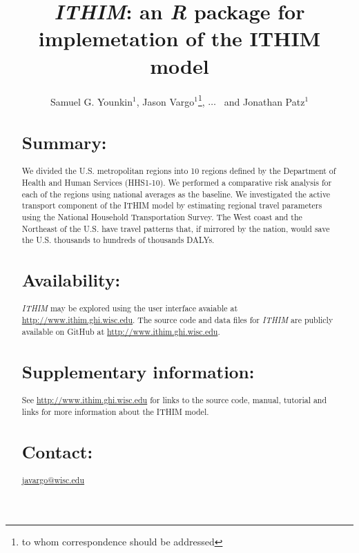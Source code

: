 \documentclass{bioinfo}
\newcommand{\package}{\emph{ITHIM}}
\newcommand{\R}{\emph{R}}
\newcommand{\webpage}{\url{http://www.ithim.ghi.wisc.edu}}
\begin{document}

\title[\package{}]{\package{}: an \R{} package for implemetation of
  the ITHIM model}
\author[Younkin \textit{et~al}]{Samuel G. Younkin$^{1}$,
  Jason Vargo$^{1}$\footnote{to whom correspondence should be addressed},
  $\ldots$
  \ and Jonathan Patz$^{1}$}
\address{$^{1}$Global Health Institute\\
University of Wisconsin{\textendash}Madison, Madison, WI USA\\
}


\maketitle

\begin{abstract}

\section{Summary:}
We divided the U.S. metropolitan regions into 10 regions defined by
the Department of Health and Human Services (HHS1-10).  We performed a
comparative risk analysis for each of the regions using national
averages as the baseline.  We investigated the active transport
component of the ITHIM model by estimating regional travel parameters
using the National Household Transportation Survey.  The West coast
and the Northeast of the U.S. have travel patterns that, if mirrored
by the nation, would save the U.S. thousands to hundreds of thousands
DALYs.

\section{Availability:}
\package{} may be explored using the user interface avaiable
at \webpage{}.  The source code and data files for \package{} are
publicly available on GitHub at \webpage{}.

\section{Supplementary information:}

See \webpage{} for links to the source code, manual, tutorial and
links for more information about the ITHIM model.

\section{Contact:}
\href{javargo@wisc.edu}{javargo@wisc.edu}
\end{abstract}
\end{document}
